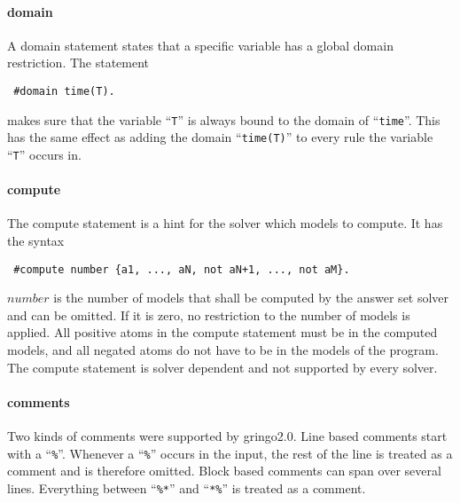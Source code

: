 \documentclass[a4paper,10pt]{article}
\begin{document}
\paragraph{domain}
A domain statement states that a specific variable has a global domain restriction.
The statement
\begin{verbatim}
 #domain time(T).
\end{verbatim}
makes sure that the variable ``\texttt{T}'' is always bound to the domain of ``\texttt{time}''.
This has the same effect as adding the domain ``\texttt{time(T)}'' to every rule the variable ``\texttt{T}'' occurs in.
\paragraph{compute}
The compute statement is a hint for the solver which models to compute.
It has the syntax
\begin{verbatim}
 #compute number {a1, ..., aN, not aN+1, ..., not aM}.
\end{verbatim}
$number$ is the number of models that shall be computed by the answer set solver and can be omitted. If it is zero, no restriction to the number of models is applied.
All positive atoms in the compute statement must be in the computed models, and all negated atoms do not have to be in the models of the program.
The compute statement is solver dependent and not supported by every solver.
\paragraph{comments}
Two kinds of comments were supported by gringo2.0.
Line based comments start with a ``\texttt{\%}''.
Whenever a ``\texttt{\%}'' occurs in the input, the rest of the line is treated as a comment and is therefore omitted.
Block based comments can span over several lines.
Everything between ``\texttt{\%*}'' and ``\texttt{*\%}'' is treated as a comment.
\end{document}
